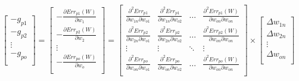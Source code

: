 \begin{equation}
 \begin{bmatrix}
  -g_{p1}   \\
  -g_{p2}   \\
  \vdots    \\
  -g_{po}   \\ 
 \end{bmatrix}
 =
  \begin{bmatrix}
  -\frac{\partial Err_{p1}(W)}{\partial w_{1}}   \\
  -\frac{\partial Err_{p2}(W)}{\partial w_{2}}   \\
  \vdots    \\
  -\frac{\partial Err_{po}(W)}{\partial w_{o}}   \\ 
 \end{bmatrix}
 =
 \begin{bmatrix}
    \frac{\partial^2 Err_{p1}}{\partial w_{1n} \partial w_{o1}} & \frac{\partial^2 Err_{p1}}{\partial w_{1n} \partial w_{o2}}  & \dots  & \frac{\partial^2 Err_{p1}(W)}{\partial w_{on} \partial w_{on}} \\
    \frac{\partial^2 Err_{p2}}{\partial w_{2n} \partial w_{o1}} & \frac{\partial^2 Err_{p2}}{\partial w_{2n} \partial w_{o2}}  & \dots  & \frac{\partial^2 Err_{p2}(W)}{\partial w_{on} \partial w_{on}} \\
    \vdots & \vdots & \ddots & \vdots \\
    \frac{\partial^2 Err_{po}}{\partial w_{on} \partial w_{o1}} & \frac{\partial^2 Err_{po}}{\partial w_{on} \partial w_{o2}}  & \dots  & \frac{\partial^2 Err_{po}(W)}{\partial w_{on} \partial w_{on}} \\
 \end{bmatrix}
\times
 \begin{bmatrix}
  \Delta w_{1n}  \\
  \Delta w_{2n}  \\
  \vdots    \\
  \Delta w_{on}   \\ 
 \end{bmatrix}
\label{gl:LM_matrix-schreibweise}
\end{equation}

